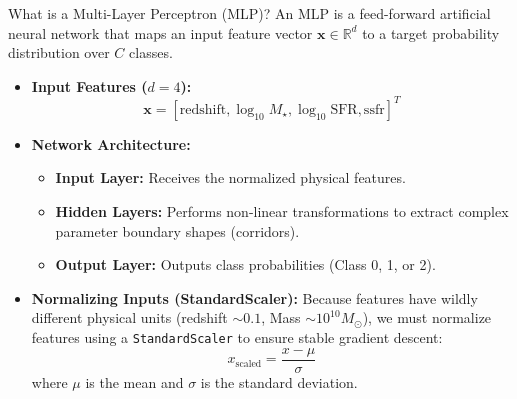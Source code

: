 \documentclass[9pt]{beamer}
\begin{document}
\begin{frame}{What is a Multi-Layer Perceptron (MLP)?}
  An MLP is a feed-forward artificial neural network that maps an input feature vector $\mathbf{x} \in \mathbb{R}^d$ to a target probability distribution over $C$ classes.
  \begin{itemize}
    \item \textbf{Input Features ($d = 4$):}
      $$\mathbf{x} = [\text{redshift}, \log_{10} M_\star, \log_{10} \text{SFR}, \text{ssfr}]^T$$
    \item \textbf{Network Architecture:}
      \begin{itemize}
        \item \textbf{Input Layer:} Receives the normalized physical features.
        \item \textbf{Hidden Layers:} Performs non-linear transformations to extract complex parameter boundary shapes (corridors).
        \item \textbf{Output Layer:} Outputs class probabilities (Class 0, 1, or 2).
      \end{itemize}
    \item \textbf{Normalizing Inputs (StandardScaler):}
      Because features have wildly different physical units (redshift $\sim 0.1$, Mass $\sim 10^{10} M_\odot$), we must normalize features using a \texttt{StandardScaler} to ensure stable gradient descent:
      $$x_{\text{scaled}} = \frac{x - \mu}{\sigma}$$
      where $\mu$ is the mean and $\sigma$ is the standard deviation.
  \end{itemize}
\end{frame}
\end{document}
